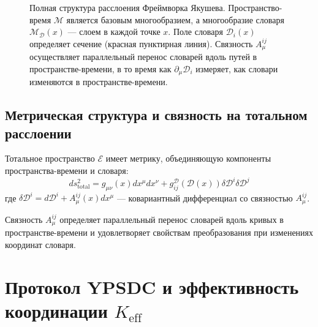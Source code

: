 \documentclass[11pt,a4paper]{article}
\begin{document}
\begin{figure}[htbp]
		\caption{Полная структура расслоения Фреймворка Якушева. Пространство-время $\mathcal{M}$ является базовым многообразием, а многообразие словаря $\mathcal{M}_{\mathcal{D}}(x)$ — слоем в каждой точке $x$. Поле словаря $\mathcal{D}_i(x)$ определяет сечение (красная пунктирная линия). Связность $A_\mu^{ij}$ осуществляет параллельный перенос словарей вдоль путей в пространстве-времени, в то время как $\partial_\mu \mathcal{D}_i$ измеряет, как словари изменяются в пространстве-времени.}
		\label{fig:complete-bundle}
	\end{figure}
	
	\subsection{Метрическая структура и связность на тотальном расслоении}
	Тотальное пространство $\mathcal{E}$ имеет метрику, объединяющую компоненты пространства-времени и словаря:
	\begin{equation}
		ds^2_{\text{total}} = g_{\mu\nu}(x) dx^\mu dx^\nu + g_{ij}^{\mathcal{D}}(\mathcal{D}(x)) \delta\mathcal{D}^i \delta\mathcal{D}^j
	\end{equation}
	где $\delta\mathcal{D}^i = d\mathcal{D}^i + A_\mu^{ij}(x) dx^\mu$ — ковариантный дифференциал со связностью $A_\mu^{ij}$.
	
	Связность $A_\mu^{ij}$ определяет параллельный перенос словарей вдоль кривых в пространстве-времени и удовлетворяет свойствам преобразования при изменениях координат словаря.
	
	\section{Протокол YPSDC и эффективность координации \texorpdfstring{$K_{\mathrm{eff}}$}{K_eff}}
	
\end{document}
